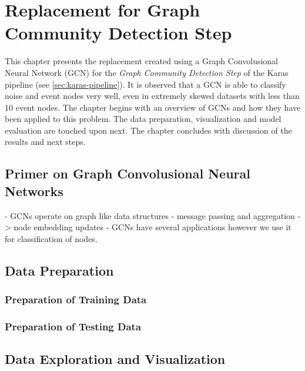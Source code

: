 
\chapter{Replacement for Graph Community Detection Step} %
\label{cha:gcd}
% 

This chapter presents the replacement created using a Graph
Convolusional Neural Network (GCN) for the \emph{Graph Community Detection
Step} of the Karas pipeline (see \ref{sec:karas-pipeline}). It is
observed that a GCN is able to classify noise and event nodes very
well, even in extremely skewed datasets with less than 10 event nodes.
The chapter begins with an overview of GCNs and how they have been
applied to this problem. The data preparation, visualization and model
evaluation are touched upon next. The chapter concludes with
discussion of the results and next steps.

\section{Primer on Graph Convolusional Neural Networks}
\label{sec:gcn-primer}

- GCNs operate on graph like data structures
- message passing and aggregation -> node embedding updates
- 
GCNs have several applications however we use it for classification of nodes.
\section{Data Preparation}
\label{sec:gcd-data-prep}

\subsection{Preparation of Training Data}
\label{sec:gcd-data-prep-train}

\subsection{Preparation of Testing Data}
\label{sec:gcd-data-prep-test}

\section{Data Exploration and Visualization}
\label{sec:gcd-data-exp}

